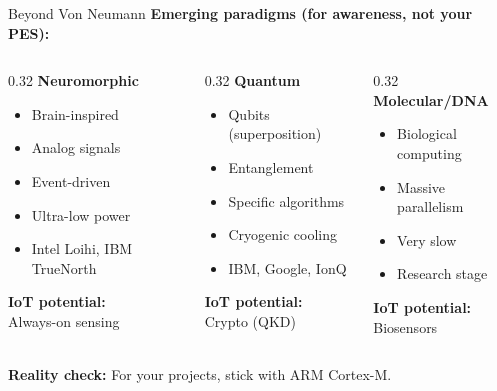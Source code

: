 \documentclass[aspectratio=169,11pt]{beamer}
\begin{document}
\begin{frame}{Beyond Von Neumann}
    \textbf{Emerging paradigms (for awareness, not your PES):}
    
    \vspace{0.3cm}
    \begin{columns}[T]
        \begin{column}{0.32\textwidth}
            \textbf{Neuromorphic}
            \begin{itemize}
                \item Brain-inspired
                \item Analog signals
                \item Event-driven
                \item Ultra-low power
                \item Intel Loihi, IBM TrueNorth
            \end{itemize}
            
            \vspace{0.2cm}
            \textbf{IoT potential:}\\
            Always-on sensing
        \end{column}
        \begin{column}{0.32\textwidth}
            \textbf{Quantum}
            \begin{itemize}
                \item Qubits (superposition)
                \item Entanglement
                \item Specific algorithms
                \item Cryogenic cooling
                \item IBM, Google, IonQ
            \end{itemize}
            
            \vspace{0.2cm}
            \textbf{IoT potential:}\\
            Crypto (QKD)
        \end{column}
        \begin{column}{0.32\textwidth}
            \textbf{Molecular/DNA}
            \begin{itemize}
                \item Biological computing
                \item Massive parallelism
                \item Very slow
                \item Research stage
            \end{itemize}
            
            \vspace{0.2cm}
            \textbf{IoT potential:}\\
            Biosensors
        \end{column}
    \end{columns}
    
    \vspace{0.3cm}
    \textbf{Reality check:} For your projects, stick with ARM Cortex-M.
\end{frame}
\end{document}
